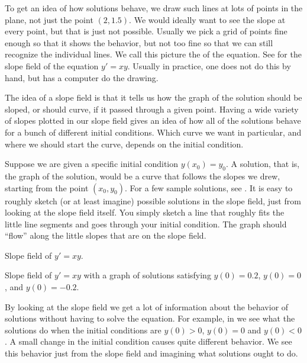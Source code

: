 To get an idea of how solutions behave, we draw such lines at lots
of points in the plane, not just the point $(2,1.5)$.  We would
ideally want to see the slope at every point, but that is
just not possible.  Usually we pick a
grid of points fine enough so that it shows the behavior, but not too
fine so that we can still recognize the individual lines.
We call this picture the \emph{} of the equation.
See  for the slope field of the equation $y' = xy$.
Usually in practice, one does not do this by hand, but has a computer do the
drawing.

The idea of a slope field is that it tells us how the graph of the solution should be sloped, 
or should curve, if it passed through a given point. Having a wide variety of slopes 
plotted in our slope field gives an idea of how all of the solutions behave for a bunch of different 
initial conditions. Which curve we want in particular, and where we should start the curve, depends on the initial condition. 

Suppose we are given a specific initial condition $y(x_0) = y_0$.
A solution, that is, the graph of the solution, would be a curve
that follows the slopes we drew, starting from the point $(x_0, y_0)$. 
For a few sample
solutions, see .  It is easy to roughly sketch
(or at least imagine)
possible solutions in the slope field, just from looking at the slope field
itself.  You simply sketch a line that roughly fits the little line segments
and goes through your initial condition. The graph should ``flow'' along the little slopes that are on the slope field. 

\begin{myfig}
\parbox[t]{2.5in}{\capstart%
 \caption{Slope field of $y' = xy$.\label{1.3:fig1}} 
 }
\quad \qquad
\parbox[t]{2.5in}{ \capstart
 \caption{Slope field of $y' = xy$ with a graph of solutions satisfying
 $y(0) = 0.2$, $y(0) = 0$, and $y(0) = -0.2$.\label{1.3:fig2}}
}
\end{myfig}

By looking at the slope field we get a lot of information
about the behavior of solutions without having to solve
the equation.  For
example, in  we see what the solutions do when the initial conditions
are $y(0) > 0$, $y(0) = 0$ and $y(0) < 0$.
A small change in the
initial condition causes quite different behavior.
We see this behavior just
from the slope field and imagining what solutions ought to do.

